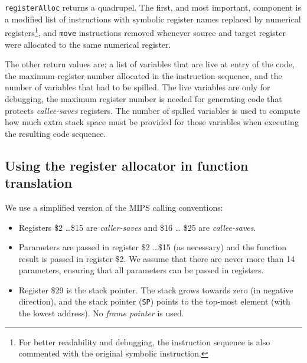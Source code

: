\documentclass[11pt,a4paper]{article}
\newcommand{\codesize}{\scriptsize}
\newcommand{\cd}[1]{{{\codesize\tt #1}}}
\begin{document}
{\tt registerAlloc} returns a quadrupel. The first, and most important, component 
is a modified list of instructions with symbolic register names replaced by 
numerical registers\footnote{For better readability and debugging, the instruction 
	sequence is also commented with the original symbolic instruction.}, and 
\cd{move} instructions removed whenever source and target register were allocated
to the same numerical register.

The other return values are: a list of variables that are live at entry of the code,
the maximum register number allocated in the instruction sequence, and the number of
variables that had to be spilled.
The live variables are only for debugging, the maximum register number
is needed for generating code that protects \emph{callee-saves} registers.
The number of spilled variables is used to compute how much extra stack space
must be provided for those variables when executing the resulting code sequence.
%

\subsection{Using the register allocator in function translation}

We use a simplified version of the MIPS calling conventions:

\begin{itemize}

\item Registers \$2 \ldots \$15 are {\em caller-saves} and \$16 \ldots
  \$25 are {\em callee-saves}.

\item Parameters are passed in register \$2 \ldots \$15 (as necessary)
	and the function result is passed in register \$2.
	We assume that there are never more than 14 parameters, ensuring that
	all parameters can be passed in registers.

\item Register \$29 is the stack pointer. The stack grows towards zero 
	(in negative direction), and the stack pointer (\cd{SP}) points to
	the top-most element (with the lowest address).
	No \emph{frame pointer} is used.

\end{itemize}
\end{document}
